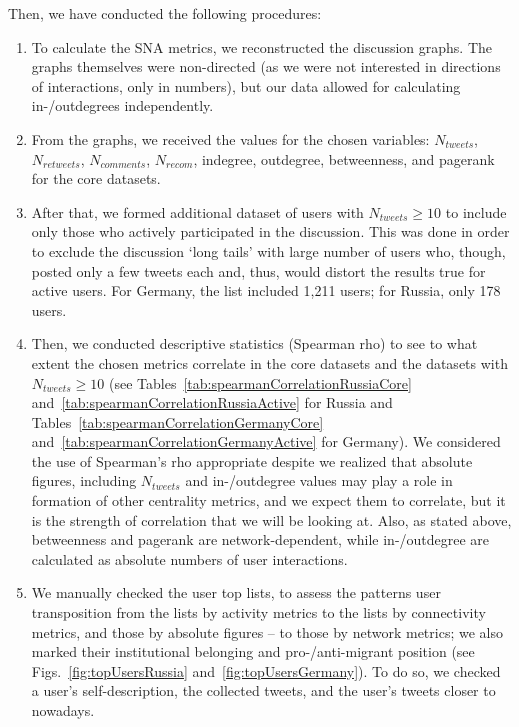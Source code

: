 Then, we have conducted the following procedures:
\begin{enumerate}
	\item To calculate the SNA metrics, we reconstructed the discussion graphs. The graphs themselves were non-directed (as we were not interested in directions of interactions, only in numbers), but our data allowed for calculating in-/outdegrees independently.
	
	\item From the graphs, we received the values for the chosen variables: \(N_{tweets}\), \(N_{retweets}\), \(N_{comments}\), \(N_{recom}\), indegree, outdegree, betweenness, and pagerank for the core datasets.
	
	\item After that, we formed additional dataset of users with \(N_{tweets} \geq 10\) to include only those who actively participated in the discussion. This was done in order to exclude the discussion ‘long tails’ with large number of users who, though, posted only a few tweets each and, thus, would distort the results true for active users. For Germany, the list included 1,211 users; for Russia, only 178 users.
	
	\item Then, we conducted descriptive statistics (Spearman rho) to see to what extent the chosen metrics correlate in the core datasets and the datasets with \(N_{tweets} \ge 10\) (see Tables~\cref{tab:spearmanCorrelationRussiaCore} and~\cref{tab:spearmanCorrelationRussiaActive} for Russia and Tables~\cref{tab:spearmanCorrelationGermanyCore} and~\cref{tab:spearmanCorrelationGermanyActive} for Germany). We considered the use of Spearman’s rho appropriate despite we realized that absolute figures, including \(N_{tweets}\) and in-/outdegree values may play a role in formation of other centrality metrics, and we expect them to correlate, but it is the strength of correlation that we will be looking at. Also, as stated above, betweenness and pagerank are network-dependent, while in-/outdegree are calculated as absolute numbers of user interactions.
	
	\item We manually checked the user top lists, to assess the patterns user transposition from the lists by activity metrics to the lists by connectivity metrics, and those by absolute figures -- to those by network metrics; we also marked their institutional belonging and pro-/anti-migrant position (see Figs.~\cref{fig:topUsersRussia} and~\cref{fig:topUsersGermany}). To do so, we checked a user’s self-description, the collected tweets, and the user’s tweets closer to nowadays.
\end{enumerate}

